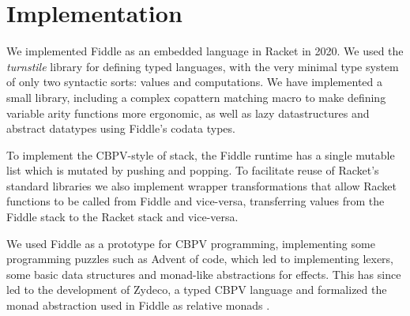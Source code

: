 \documentclass[acmsmall,screen,review,anonymous]{acmart}
\begin{document}

\section{Implementation}

We implemented Fiddle as an embedded language in Racket in 2020. We
used the \emph{turnstile} library \cite{turnstile} for defining typed
languages, with the very minimal type system of only two syntactic
sorts: values and computations. We have implemented a small library,
including a complex copattern matching macro to make defining variable
arity functions more ergonomic, as well as lazy datastructures and
abstract datatypes using Fiddle's codata types.

To implement the CBPV-style of stack, the Fiddle runtime has a single
mutable list which is mutated by pushing and popping. To facilitate
reuse of Racket's standard libraries we also implement wrapper
transformations that allow Racket functions to be called from Fiddle
and vice-versa, transferring values from the Fiddle stack to the
Racket stack and vice-versa.

We used Fiddle as a prototype for CBPV programming, implementing some
programming puzzles such as Advent of code, which led to implementing
lexers, some basic data structures and monad-like abstractions for
effects. This has since led to the development of Zydeco, a typed CBPV
language and formalized the monad abstraction used in Fiddle as
relative monads \cite{zydeco, relative-monads}.


\end{document}
